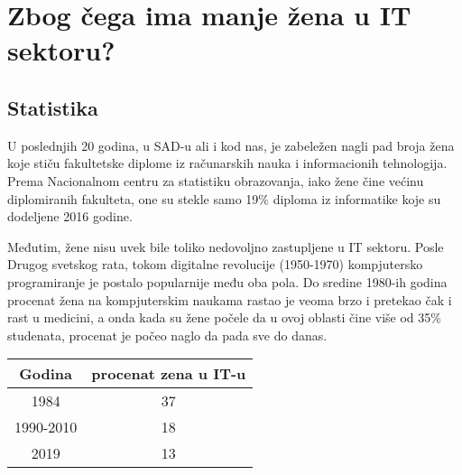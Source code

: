 \documentclass[a4paper,12pt]{article}
\begin{document}
\section{Zbog čega ima manje žena u IT sektoru?}

\subsection{Statistika}
\begin{flushleft}
U poslednjih 20 godina, u SAD-u ali i kod nas, je zabeležen nagli pad broja žena koje stiču fakultetske diplome iz računarskih nauka i
informacionih tehnologija. Prema Nacionalnom centru za statistiku obrazovanja, iako žene čine većinu diplomiranih fakulteta, 
one su stekle samo 19\% diploma iz informatike koje su dodeljene 2016 godine.

Međutim, žene nisu uvek bile toliko nedovoljno zastupljene u IT sektoru. Posle Drugog svetskog rata, 
tokom digitalne revolucije (1950-1970) kompjutersko programiranje je postalo popularnije među oba pola. 
Do sredine 1980-ih godina procenat žena na kompjuterskim naukama rastao je veoma brzo i pretekao čak i rast u medicini, 
a onda kada su žene počele da u ovoj oblasti čine više od 35\% studenata, procenat je počeo naglo da pada sve do danas. 
\end{flushleft}


\begin{table}[h]
\centering
\begin{tabular}{c|c}
\toprule
Godina    & procenat zena u IT-u \\ 
\midrule
1984      & 37                   \\ 
1990-2010 & 18                   \\ 
2019      & 13                   \\ 
\bottomrule
\end{tabular}
\end{table}
\end{document}
